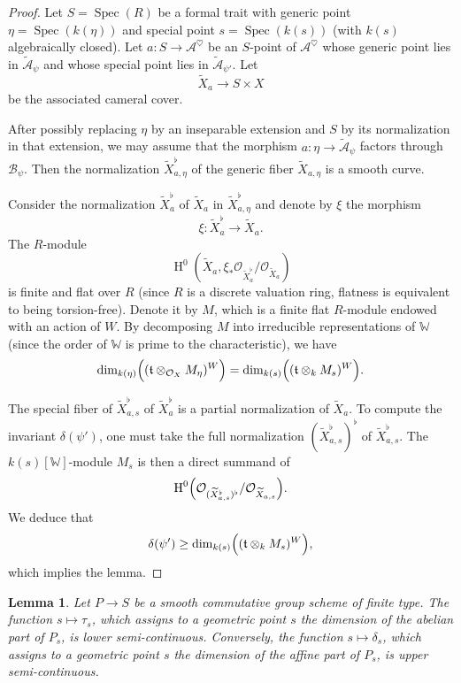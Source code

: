 \documentclass[12pt,english]{smfart}
\numberwithin{equation}{subsection}
\newtheorem{lemma}[equation]{Lemma}
\theoremstyle{remark}
\begin{document}
\begin{proof}
Let $S=\operatorname{Spec}(R)$ be a formal trait with generic point $\eta=\operatorname{Spec}(k(\eta))$ and special point $s=\operatorname{Spec}(k(s))$ (with $k(s)$ algebraically closed). Let $a:S\rightarrow \mathcal{A}^\heartsuit$ be an $S$-point of $\mathcal{A}^\heartsuit$ whose generic point lies in $\tilde{\mathcal{A}}_\psi$ and whose special point lies in $\tilde{\mathcal{A}}_{\psi'}$. Let 
$$\widetilde X_a \rightarrow S\times X$$ 
be the associated cameral cover.

After possibly replacing $\eta$ by an inseparable extension and $S$ by its normalization in that extension, we may assume that the morphism $a:\eta\rightarrow \tilde{\mathcal{A}}_\psi$ factors through $\mathcal{B}_\psi$. Then the normalization $\widetilde X_{a,\eta}^\flat$ of the generic fiber $\widetilde X_{a,\eta}$ is a smooth curve.

Consider the normalization $\widetilde X_a^\flat$ of $\widetilde X_a$ in $\widetilde X_{a,\eta}^\flat$ and denote by $\xi$ the morphism
$$\xi:\widetilde X_a^\flat\rightarrow \widetilde X_a.$$ 
The $R$-module 
$$\operatorname{H}^0(\widetilde X_a,\xi_*\mathcal{O}_{\widetilde X_a^\flat}/\mathcal{O}_{\widetilde X_a})$$ 
is finite and flat over $R$ (since $R$ is a discrete valuation ring, flatness is equivalent to being torsion-free). Denote it by $M$, which is a finite flat $R$-module endowed with an action of $W$. By decomposing $M$ into irreducible representations of $\mathbb{W}$ (since the order of $\mathbb{W}$ is prime to the characteristic), we have
$$\dim_{k(\eta)}\Bigl((\mathfrak{t}\otimes_{\mathcal{O}_X} M_{\eta})^{W}\Bigr) =
\dim_{k(s)}\Bigl((\mathfrak{t}\otimes_k M_s)^{W}\Bigr).$$

The special fiber of $\widetilde X_{a,s}^\flat$ of $\widetilde X_a^\flat$ is a partial normalization of $\widetilde X_a$. To compute the invariant $\delta(\psi')$, one must take the full normalization $(\widetilde X_{a,s}^\flat)^\flat$ of $\widetilde X_{a,s}^\flat$. The $k(s)[\mathbb{W}]$-module $M_s$ is then a direct summand of 
$$\operatorname{H}^0\Bigl(\mathcal{O}_{(\widetilde X_{a,s}^\flat)^\flat}/\mathcal{O}_{\widetilde X_{a,s}}\Bigr).$$
We deduce that
$$\delta(\psi')\geq \dim_{k(s)}\Bigl((\mathfrak{t}\otimes_k M_s)^{W}\Bigr),$$
which implies the lemma.
\end{proof}

\begin{lemma}\label{delta semicontinu}
Let $P\rightarrow S$ be a smooth commutative group scheme of finite type. The function $s\mapsto \tau_s$, which assigns to a geometric point $s$ the dimension of the abelian part of $P_s$, is lower semi-continuous. Conversely, the function $s\mapsto \delta_s$, which assigns to a geometric point $s$ the dimension of the affine part of $P_s$, is upper semi-continuous.
\end{lemma}
\end{document}
